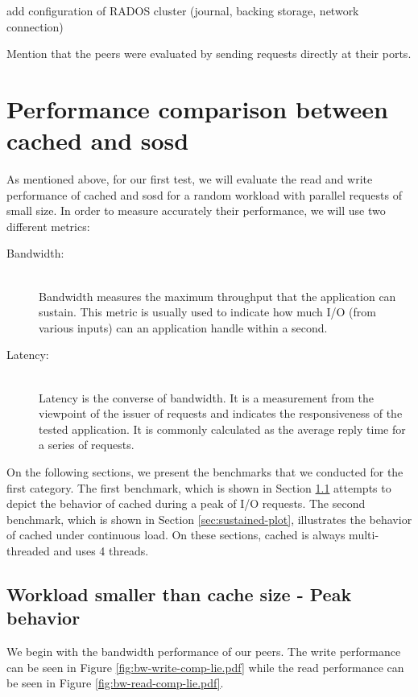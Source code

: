 \todo add configuration of RADOS cluster (journal, backing storage, network 
connection)

\fixme Mention that the peers were evaluated by sending requests directly at 
their ports.

\section{Performance comparison between cached and sosd}
\label{sec:perf-plot}

As mentioned above, for our first test, we will evaluate the read and write 
performance of cached and sosd for a random workload with parallel requests of 
small size. In order to measure accurately their performance, we will use two 
different metrics:

\begin{description}
	\item[Bandwidth:] \hfill \\
		Bandwidth measures the maximum throughput that the application 
		can sustain. This metric is usually used to indicate how much 
		I/O (from various inputs) can an application handle within a 
		second.
	\item[Latency:] \hfill \\
		Latency is the converse of bandwidth. It is a measurement from 
		the viewpoint of the issuer of requests and indicates the 
		responsiveness of the tested application. It is commonly 
		calculated as the average reply time for a series of requests.
\end{description}

On the following sections, we present the benchmarks that we conducted for the 
first category. The first benchmark, which is shown in Section 
\ref{sec:peak-plot} attempts to depict the behavior of cached during a peak of 
I/O requests. The second benchmark, which is shown in Section 
\ref{sec:sustained-plot}, illustrates the behavior of cached under continuous 
load.  On these sections, cached is always multi-threaded and uses 4 threads.

\subsection{Workload smaller than cache size - Peak behavior}
\label{sec:peak-plot}

We begin with the bandwidth performance of our peers. The write performance can 
be seen in Figure \ref{fig:bw-write-comp-lie.pdf} while the read performance 
can be seen in Figure \ref{fig:bw-read-comp-lie.pdf}.

